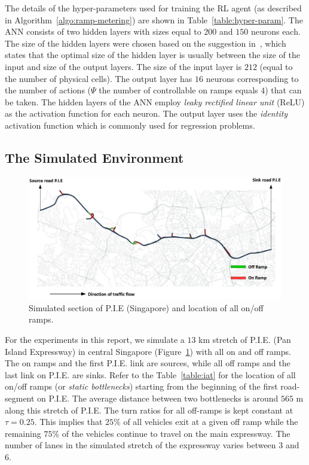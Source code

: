 \documentclass{sig-alternate-05-2015}
\begin{document}
The details of the hyper-parameters used for training the RL agent (as described in Algorithm~\ref{algo:ramp-metering}) are shown in Table~\ref{table:hyper-param}. The ANN consists of two hidden layers with sizes equal to $200$ and $150$ neurons each. The size of the hidden layers were chosen based on the suggestion in~\cite{heaton2008introduction}, which states that the optimal size of the hidden layer is usually between the size of the input and size of the output layers. The size of the input layer is $212$ (equal to the number of physical cells). The output layer has $16$ neurons corresponding to the number of actions ($\Psi$ the number of controllable on ramps equals $4$) that can be taken. The hidden layers of the ANN employ {\it leaky rectified linear unit} (ReLU) as the activation function for each neuron. The output layer uses the {\it identity} activation function which is commonly used for regression problems. 





\subsection{The Simulated Environment}
\label{subsec:pie}
\begin{center}
	\begin{figure}[!htbp]
		\centering
		\includegraphics[scale=0.28]{images/PIE.jpg}
		\captionsetup{justification=centering}
		\caption{Simulated section of P.I.E (Singapore) and location of all on/off ramps.}
		\label{fig:pie-changi}
	\end{figure}
\end{center}

For the experiments in this report, we simulate a $13$ km stretch of P.I.E. (Pan Island Expressway) in central Singapore (Figure~\ref{fig:pie-changi}) with all on and off ramps. The on ramps and the first P.I.E. link are sources, while all off ramps and the last link on P.I.E. are sinks. Refer to the Table~\ref{table:iat} for the location of all on/off ramps (or {\it static bottlenecks}) starting from the beginning of the first road-segment on P.I.E. The average distance between two bottlenecks is around $565\text{~m}$ along this stretch of P.I.E. The turn ratios for all off-ramps is kept constant at $\tau=0.25$. This implies that $25\%$ of all vehicles exit at a given off ramp while the remaining $75\%$ of the vehicles continue to travel on the main expressway. The number of lanes in the simulated stretch of the expressway varies between $3$ and $6$.
\end{document}
